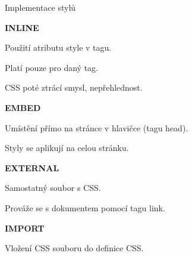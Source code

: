 \documentclass[aspectratio=169]{beamer}
\begin{document}
\begin{frame}{Implementace stylů}
    \begin{multicols}{2}
        \centering

        \begin{cardTiny}
            \begin{center}
                \textbf{INLINE}
            \end{center}

            \begin{flushleft}
                Použití atributu style v tagu.

                Platí pouze pro daný tag. 

                CSS poté ztrácí smysl, nepřehlednost.
            \end{flushleft}
        \end{cardTiny}
        \begin{cardTiny}
            \begin{center}
                \textbf{EMBED}
            \end{center}
        
            \begin{flushleft}
                Umístění přímo na stránce v hlavičce (tagu head).

                Styly se aplikují na celou stránku.
            \end{flushleft}
        \end{cardTiny}
        \begin{cardTiny}
            \begin{center}
                \textbf{EXTERNAL}
            \end{center}
        
            \begin{flushleft}
                Samostatný soubor s CSS.

                Prováže se s dokumentem pomocí tagu link.
            \end{flushleft}
        \end{cardTiny}
        \begin{cardTiny}
            \begin{center}
                \textbf{IMPORT}
            \end{center}
        
            \begin{flushleft}
                Vložení CSS souboru do definice CSS.
            \end{flushleft}
        \end{cardTiny}
    \end{multicols}
\end{frame}
\end{document}
